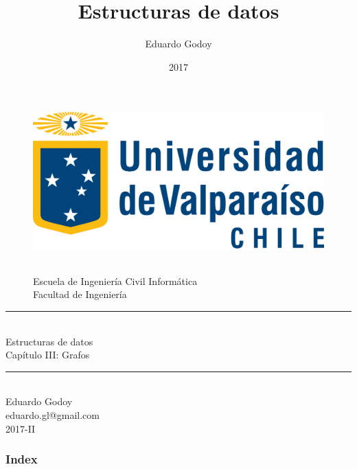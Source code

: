 \documentclass[handout]{beamer} %
\title{Estructuras de datos}   %
\author{Eduardo Godoy} %
\date{2017}                    %
\institute{Universidad de Valparaíso}                 %
\newcommand{\HRule}{\rule{\linewidth}{0.2mm}\\[1ex]}
\begin{document}
%

\begin{frame}[plain]
  \begin{figure}[h]
    \begin{minipage}{0.3\textwidth}
    \includegraphics[width=.9\textwidth]{./image/logo-UV.png}
    \end{minipage}
    \begin{minipage}{0.65\textwidth}
     $~$\\[3.6ex]
     \footnotesize{Escuela de Ingeniería Civil Informática}\\
     \footnotesize{Facultad de Ingeniería}
    \end{minipage}
  \end{figure}
  \begin{center}
    \vspace{1ex}
    \HRule
    \Large{Estructuras de datos}\\{\small Capítulo III: Grafos}\\[-1ex]
    \HRule\vspace{1ex}
    \large{Eduardo Godoy}\\[.5ex]\footnotesize{eduardo.gl@gmail.com}\\[6ex] {\tiny 2017-II}\\[6ex]
  \end{center}
\end{frame}

\begin{frame}
 \frametitle{Index}
 \scriptsize 			%
 \tableofcontents		%
\end{frame}
\end{document}
